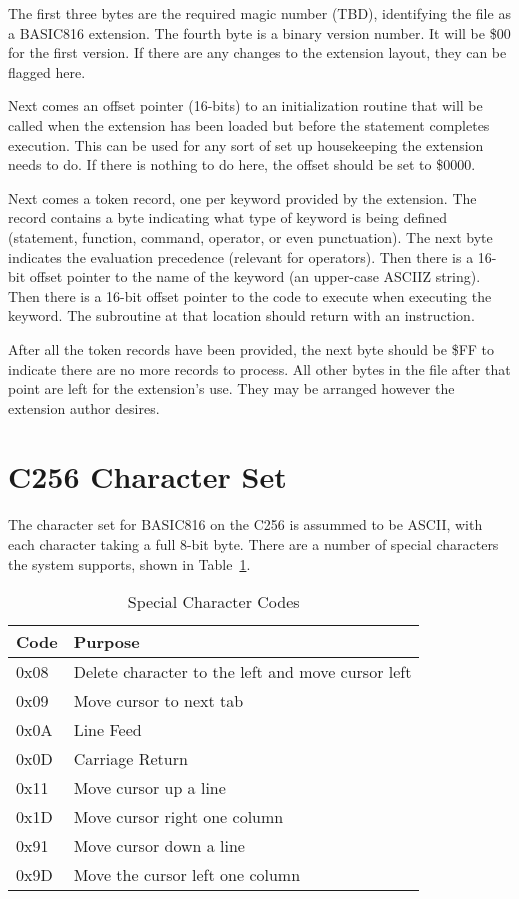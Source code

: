 \documentclass{report}
\begin{document}
    The first three bytes are the required magic number (TBD), identifying the file as a BASIC816 extension.
    The fourth byte is a binary version number. It will be \$00 for the first version. If there are any changes to the extension
    layout, they can be flagged here.
    
    Next comes an offset pointer (16-bits) to an initialization routine that will be called when the extension has been loaded
    but before the  statement completes execution. This can be used for any sort of set up housekeeping the
    extension needs to do. If there is nothing to do here, the offset should be set to \$0000.
    
    Next comes a token record, one per keyword provided by the extension. The record contains a byte indicating what type
    of keyword is being defined (statement, function, command, operator, or even punctuation). The next byte indicates the
    evaluation precedence (relevant for operators). Then there is a 16-bit offset pointer to the name of the keyword (an
    upper-case ASCIIZ string). Then there is a 16-bit offset pointer to the code to execute when executing the keyword. The
    subroutine at that location should return with an  instruction.
    
    After all the token records have been provided, the next byte should be \$FF to indicate there are no more records to process.
    All other bytes in the file after that point are left for the extension's use. They may be arranged however the extension
    author desires.

    \section*{C256 Character Set}

    The character set for BASIC816 on the C256 is assummed to be ASCII, with each character taking a full 8-bit byte.
    There are a number of special characters the system supports, shown in Table~\ref{char_codes}.

    \begin{table}
        \begin{tabular}{|l|l|} \hline
            Code & Purpose \\ \hline\hline
            0x08 & Delete character to the left and move cursor left \\ \hline
            0x09 & Move cursor to next tab \\ \hline
            0x0A & Line Feed \\ \hline
            0x0D & Carriage Return \\ \hline
            0x11 & Move cursor up a line \\ \hline
            0x1D & Move cursor right one column \\ \hline
            0x91 & Move cursor down a line \\ \hline
            0x9D & Move the cursor left one column \\ \hline
        \end{tabular}
        \caption{Special Character Codes}
        \label{char_codes}
    \end{table}
    
\end{document}
